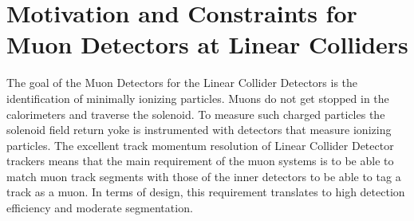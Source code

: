 \section{Motivation and Constraints for Muon Detectors at Linear Colliders}

The goal of the Muon Detectors for the Linear Collider Detectors is the identification of minimally ionizing particles. Muons do not get stopped in the calorimeters and traverse the solenoid. To measure such charged particles the solenoid field return yoke is instrumented with detectors that measure ionizing particles. The excellent track momentum resolution of Linear Collider Detector trackers means that the main requirement of the muon systems is to be able to match muon track segments with those of the inner detectors to be able to tag a track as a muon. In terms of design, this requirement translates to high detection efficiency and moderate segmentation.
